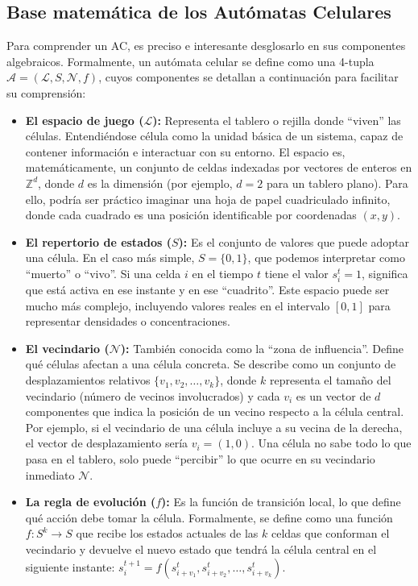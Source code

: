 \documentclass[runningheads]{llncs}
\begin{document}
\subsection{Base matemática de los Autómatas Celulares}
Para comprender un AC, es preciso e interesante desglosarlo en sus componentes algebraicos. Formalmente, un autómata celular se define como una 4-tupla $\mathcal{A} = (\mathcal{L}, S, \mathcal{N}, f)$, cuyos componentes se detallan a continuación para facilitar su comprensión:
\begin{itemize}
    \item \textbf{El espacio de juego ($\mathcal{L}$):} Representa el tablero o rejilla donde ``viven'' las células. Entendiéndose célula como la unidad básica de un sistema, capaz de contener información e interactuar con su entorno. El espacio es, matemáticamente, un conjunto de celdas indexadas por vectores de enteros en $\mathbb{Z}^d$, donde $d$ es la dimensión (por ejemplo, $d=2$ para un tablero plano). Para ello, podría ser práctico imaginar una hoja de papel cuadriculado infinito, donde cada cuadrado es una posición identificable por coordenadas $(x, y)$.
    \item \textbf{El repertorio de estados ($S$):} Es el conjunto de valores que puede adoptar una célula. En el caso más simple, $S = \{0, 1\}$, que podemos interpretar como ``muerto'' o ``vivo''. Si una celda $i$ en el tiempo $t$ tiene el valor $s_i^t = 1$, significa que está activa en ese instante y en ese ``cuadrito''. Este espacio puede ser mucho más complejo, incluyendo valores reales en el intervalo $[0, 1]$ para representar densidades o concentraciones.
    \item \textbf{El vecindario ($\mathcal{N}$):} También conocida como la ``zona de influencia''. Define qué células afectan a una célula concreta. Se describe como un conjunto de desplazamientos relativos $\{v_1, v_2, \dots, v_k\}$, donde $k$ representa el tamaño del vecindario (número de vecinos involucrados) y cada $v_i$ es un vector de $d$ componentes que indica la posición de un vecino respecto a la célula central. Por ejemplo, si el vecindario de una célula incluye a su vecina de la derecha, el vector de desplazamiento sería $v_i = (1, 0)$. Una célula no sabe todo lo que pasa en el tablero, solo puede ``percibir'' lo que ocurre en su vecindario inmediato $\mathcal{N}$.
    \item \textbf{La regla de evolución ($f$):} Es la función de transición local, lo que define qué acción debe tomar la célula. Formalmente, se define como una función $f: S^k \to S$ que recibe los estados actuales de las $k$ celdas que conforman el vecindario y devuelve el nuevo estado que tendrá la célula central en el siguiente instante: $s_i^{t+1} = f(s_{i+v_1}^t, s_{i+v_2}^t, \dots, s_{i+v_k}^t)$.
\end{itemize}
\end{document}
